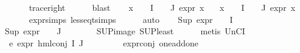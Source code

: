 \begin{isabellebody}
\ \ \ \ \isamarkupfalse%
\ trace{\isacharunderscore}{\kern0pt}right\isanewline
\ \ \ \ \isamarkupfalse%
\ blast\isanewline
\ \ \isamarkupfalse%
\ {\isachardoublequoteopen}{\isasymforall}x\ {\isasymin}\ {\isasymPhi}\ {\isacharbackquote}{\kern0pt}\ I\ {\isasymunion}\ {\isasymPhi}\ {\isacharbackquote}{\kern0pt}\ J{\isachardot}{\kern0pt}\ expr{\isacharunderscore}{\kern0pt}{}\ x\ {\isacharless}{\kern0pt}{\isacharequal}{\kern0pt}\ {}{\isachardoublequoteclose}\isanewline
{}\ {\isachardoublequoteopen}{\isasymforall}x\ {\isasymin}\ {\isasymPhi}\ {\isacharbackquote}{\kern0pt}\ I\ {\isasymunion}\ {\isasymPhi}\ {\isacharbackquote}{\kern0pt}\ J{\isachardot}{\kern0pt}\ expr{\isacharunderscore}{\kern0pt}{}\ x\ {\isasymle}\ {}{\isachardoublequoteclose}\isanewline
\ \ \ \ \isamarkupfalse%
\ expr{\isachardot}{\kern0pt}simps\ less{\isacharunderscore}{\kern0pt}eq{\isacharunderscore}{\kern0pt}t{\isachardot}{\kern0pt}simps\isanewline
\ \ \ \ \isamarkupfalse%
\ auto\isanewline
\ \ \isamarkupfalse%
\ {\isachardoublequoteopen}Sup\ {\isacharparenleft}{\kern0pt}{\isacharparenleft}{\kern0pt}expr{\isacharunderscore}{\kern0pt}{}\ {\isasymcirc}\ {\isasymPhi}{\isacharparenright}{\kern0pt}\ {\isacharbackquote}{\kern0pt}\ I{\isacharparenright}{\kern0pt}\ {\isasymle}\ {}{\isachardoublequoteclose}\ \isanewline
{\isachardoublequoteopen}Sup\ {\isacharparenleft}{\kern0pt}{\isacharparenleft}{\kern0pt}expr{\isacharunderscore}{\kern0pt}{}\ {\isasymcirc}\ {\isasymPhi}{\isacharparenright}{\kern0pt}\ {\isacharbackquote}{\kern0pt}\ J{\isacharparenright}{\kern0pt}\ {\isasymle}\ {}{\isachardoublequoteclose}\isanewline
\ \ \ \ \isamarkupfalse%
\ SUP{\isacharunderscore}{\kern0pt}image\ SUP{\isacharunderscore}{\kern0pt}least\isanewline
\ \ \ \ \isamarkupfalse%
\ {\isacharparenleft}{\kern0pt}metis\ UnCI{\isacharparenright}{\kern0pt}{\isacharplus}{\kern0pt}\isanewline
\ \ \isamarkupfalse%
\ e{}{\isacharcolon}{\kern0pt}\ {\isachardoublequoteopen}expr{\isacharunderscore}{\kern0pt}{}\ {\isacharparenleft}{\kern0pt}hml{\isacharunderscore}{\kern0pt}conj\ I\ J\ {\isasymPhi}{\isacharparenright}{\kern0pt}\ {\isasymle}\ {}{\isachardoublequoteclose}\isanewline
\ \ \ \ \isamarkupfalse%
\ expr{\isacharunderscore}{\kern0pt}{}{\isacharunderscore}{\kern0pt}conj\ one{\isacharunderscore}{\kern0pt}add{\isacharunderscore}{\kern0pt}one\isanewline

\end{isabellebody}
